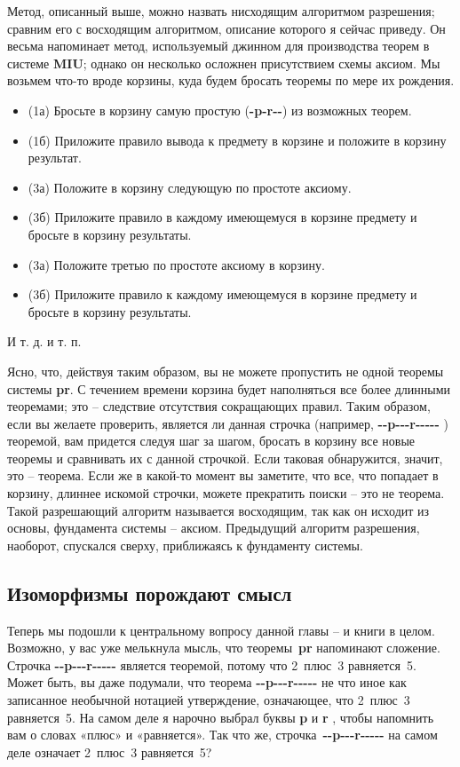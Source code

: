 \documentclass[../main.tex]{subfiles}
\begin{document}
Метод, описанный выше, можно назвать нисходящим алгоритмом разрешения; сравним его с восходящим алгоритмом, описание которого я сейчас приведу. Он весьма напоминает метод, используемый джинном для производства теорем в системе \textbf{MIU}; однако он несколько осложнен присутствием схемы аксиом. Мы возьмем что-то вроде корзины, куда будем бросать теоремы по мере их рождения.
\begin{itemize}[label={}, noitemsep, topsep=6pt]
    \item (1а) Бросьте в корзину самую простую (\textbf{-p-r-{}-}) из возможных теорем.
    \item (1б) Приложите правило вывода к предмету в корзине и положите в корзину результат.
    \item (3а) Положите в корзину следующую по простоте аксиому.
    \item (3б) Приложите правило в каждому имеющемуся в корзине предмету и бросьте в корзину результаты.
    \item (3а) Положите третью по простоте аксиому в корзину.
    \item (3б) Приложите правило к каждому имеющемуся в корзине предмету и бросьте в корзину результаты.
\end{itemize}

И т. д. и т. п.

Ясно, что, действуя таким образом, вы не можете пропустить не одной теоремы системы \textbf{pr}.
С течением времени корзина будет наполняться все более длинными теоремами; это \--- следствие отсутствия сокращающих правил.
Таким образом, если вы желаете проверить, является ли данная строчка (например, \textbf{-{}-p-{}-{}-r-{}-{}-{}-{}-} ) теоремой, вам придется следуя шаг за шагом, бросать в корзину все новые теоремы и сравнивать их с данной строчкой.
Если таковая обнаружится, значит, это \--- теорема.
Если же в какой-то момент вы заметите, что все, что попадает в корзину, длиннее искомой строчки, можете прекратить поиски \--- это не теорема.
Такой разрешающий алгоритм называется восходящим, так как он исходит из основы, фундамента системы \--- аксиом.
Предыдущий алгоритм разрешения, наоборот, спускался сверху, приближаясь к фундаменту системы.


\subsection{Изоморфизмы порождают смысл}

Теперь мы подошли к центральному вопросу данной главы \--- и книги в целом.
Возможно, у вас уже мелькнула мысль, что теоремы~\textbf{pr} напоминают сложение.
Строчка \textbf{-{}-p-{}-{}-r-{}-{}-{}-{}-} является теоремой, потому что 2~плюс~3 равняется~5.
Может быть, вы даже подумали, что теорема \textbf{-{}-p-{}-{}-r-{}-{}-{}-{}-} не что иное как записанное необычной нотацией утверждение, означающее, что 2~плюс~3 равняется~5.
На самом деле я нарочно выбрал буквы \textbf{p} и \textbf{r} , чтобы напомнить вам о словах «плюс» и «равняется». Так что же, строчка~\textbf{-{}-p-{}-{}-r-{}-{}-{}-{}-} на самом деле означает 2~плюс~3 равняется~5?
\end{document}
